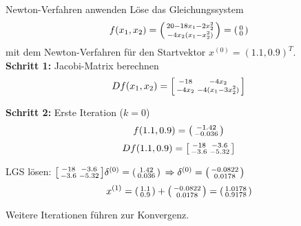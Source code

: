 \begin{example2}{Newton-Verfahren anwenden} Löse das Gleichungssystem 
$$f(x_1, x_2) = \begin{psmallmatrix} 20 - 18x_1 - 2x_2^2 \\ -4x_2(x_1 - x_2^2) \end{psmallmatrix} = \begin{psmallmatrix} 0 \\ 0 \end{psmallmatrix}$$
mit dem Newton-Verfahren für den Startvektor $x^{(0)} = (1.1, 0.9)^T$.
\vspace{2mm}\\
\textbf{Schritt 1:} Jacobi-Matrix berechnen
$$Df(x_1, x_2) = \begin{bsmallmatrix} -18 & -4x_2 \\ -4x_2 & -4(x_1 - 3x_2^2) \end{bsmallmatrix}$$

\textbf{Schritt 2:} Erste Iteration ($k = 0$)
$$f(1.1, 0.9) = \begin{psmallmatrix} -1.42 \\ -0.036 \end{psmallmatrix}$$
$$Df(1.1, 0.9) = \begin{bsmallmatrix} -18 & -3.6 \\ -3.6 & -5.32 \end{bsmallmatrix}$$

LGS lösen: $\begin{bsmallmatrix} -18 & -3.6 \\ -3.6 & -5.32 \end{bsmallmatrix} \delta^{(0)} = \begin{psmallmatrix} 1.42 \\ 0.036 \end{psmallmatrix}$
$\Rightarrow \delta^{(0)} = \begin{psmallmatrix} -0.0822 \\ 0.0178 \end{psmallmatrix}$
$$x^{(1)} = \begin{psmallmatrix} 1.1 \\ 0.9 \end{psmallmatrix} + \begin{psmallmatrix} -0.0822 \\ 0.0178 \end{psmallmatrix} = \begin{psmallmatrix} 1.0178 \\ 0.9178 \end{psmallmatrix}$$

Weitere Iterationen führen zur Konvergenz.
\end{example2}

